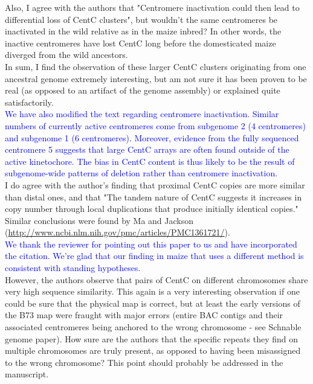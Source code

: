 \documentclass[]{article}
\newcommand{\res}[1]{\noindent \textcolor{blue}{{#1}} \\}
\begin{document}
Also, I agree with the authors that "Centromere inactivation could then lead to differential loss of CentC clusters", but wouldn't the same centromeres be inactivated in the wild relative as in the maize inbred? In other words, the inactive centromeres have lost CentC long before the domesticated maize diverged from the wild ancestors.  \\In sum, I find the observation of these larger CentC clusters originating from one ancestral genome extremely interesting, but am not sure it has been proven to be real (as opposed to an artifact of the genome assembly) or explained quite satisfactorily.\\

\res{
We have also modified the text regarding centromere inactivation.  
Similar numbers of currently active centromeres come from subgenome 2 (4 centromeres) and subgenome 1 (6 centromeres).  
Moreover, evidence from the fully sequenced centromere 5 suggests that large CentC arrays are often found outside of the active kinetochore.  
The bias in CentC content is thus likely to be the result of subgenome-wide patterns of deletion rather than centromere inactivation.
} %

I do agree with the author's finding that proximal CentC copies are more similar than distal ones, and that "The tandem nature of CentC suggests it increases in copy number through local duplications that produce initially identical copies." Similar conclusions were found by Ma and Jackson (\url{http://www.ncbi.nlm.nih.gov/pmc/articles/PMC1361721/}).\\

\res{We thank the reviewer for pointing out this paper to us and have incorporated the citation.  We're glad that our finding in maize that uses a different method is consistent with standing hypotheses.}

However, the authors observe that pairs of  CentC on different chromosomes share very high sequence similarity.  This again is a very interesting observation if one could be sure that the physical map is correct, but at least the early versions of the B73 map were fraught with major errors (entire BAC contigs and their associated centromeres being anchored to the wrong chromosome - see Schnable genome paper).  How sure are the authors that the specific repeats they find on multiple chromosomes are truly present, as opposed to having been misassigned to the wrong chromosome? This point should probably be addressed in the manuscript.\\
\end{document}
